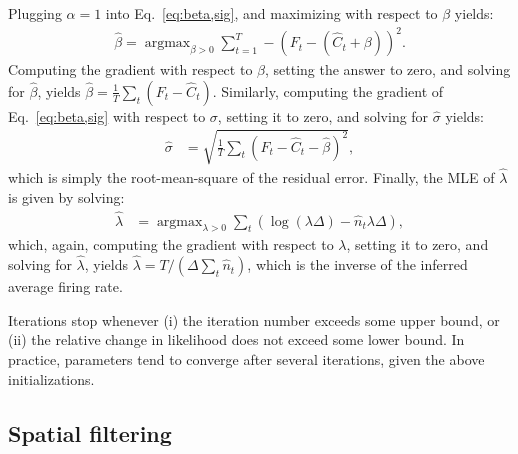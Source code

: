 \documentclass{article}
\DeclareMathOperator*{\argmax}{argmax}
\newcommand{\hn}{\widehat{n}}
\newcommand{\hC}{\widehat{C}}
\newcommand{\Del}{\Delta}
\newcommand{\sig}{\sigma}
\newcommand{\lam}{\lambda}
\newcommand{\hbeta}{\widehat{\beta}}
\newcommand{\hsig}{\widehat{\sigma}}
\newcommand{\hlam}{\widehat{\lambda}}
\begin{document}
Plugging $\alpha=1$ into Eq.~\eqref{eq:beta,sig}, and maximizing with respect to $\beta$ yields:
\begin{align}
\hbeta = \argmax_{\beta>0} \sum_{t=1}^T -(F_t - (\hC_t + \beta))^2.
\end{align}
\noindent Computing the gradient with respect to $\beta$, setting the answer to zero, and solving for $\hbeta$, yields $\hbeta = \frac{1}{T} \sum_t (F_t-\hC_t)$.  Similarly, computing the gradient of Eq.~\eqref{eq:beta,sig} with respect to $\sig$, setting it to zero, and solving for $\hsig$ yields:
\begin{align}
\hsig &= \sqrt{\frac{1}{T} \sum_t (F_t - \hC_t - \hbeta)^2},
\end{align}
which is simply the root-mean-square of the residual error.  Finally, the MLE of $\hlam$ is given by solving:
\begin{align}
\hlam &= \argmax_{\lam>0} \sum_t (\log (\lam \Del) - \hn_t \lam \Del),
\end{align}
which, again, computing the gradient with respect to $\lam$, setting it to zero, and solving for $\hlam$, yields $\hlam=T/ (\Del \sum_t \hn_t)$, which is the inverse of the inferred average firing rate.


Iterations stop whenever (i) the iteration number exceeds some upper bound, or (ii) the relative change in likelihood does not exceed some lower bound.  In practice, parameters tend to converge after several iterations, given the above initializations. 


\subsection{Spatial filtering} \label{sec:methods:spatial}
\end{document}
